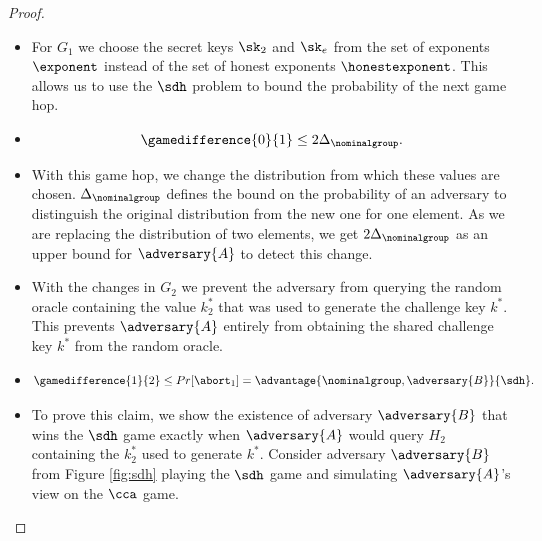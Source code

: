\begin{proof}
                                \begin{itemize}
                                \item[\textbf{Game 1}]
                                    For $G_1$ we choose the secret keys $\sk_2$ and $\sk_e$ from the set of exponents $\exponent$ instead of the set of honest exponents $\honestexponent$.
                                    This allows us to use the $\sdh$ problem to bound the probability of the next game hop.

                                \item[\emph{Claim 1}]

                                    \[ \gamedifference{0}{1} \leq 2 \Delta_{\nominalgroup}. \]

                                \item[\emph{Proof}]
                                    With this game hop, we change the distribution from which these values are chosen.
                                    $\Delta_{\nominalgroup}$ defines the bound on the probability of an adversary to distinguish the original distribution from the new one for one element.
                                    As we are replacing the distribution of two elements, we get $2 \Delta_{\nominalgroup}$ as an upper bound for $\adversary{A}$ to detect this change.
                                \end{itemize}

                                \begin{itemize}
                                \item[\textbf{Game 2}]
                                    With the changes in $G_2$ we prevent the adversary from querying the random oracle containing the value $k^*_2$ that was used to generate the challenge key $k^*$.
                                    This prevents $\adversary{A}$ entirely from obtaining the shared challenge key $k^*$ from the random oracle.

                                \item[\emph{Claim 2}]

                                    \[ \gamedifference{1}{2} \leq Pr[\abort_1] = \advantage{\nominalgroup, \adversary{B}}{\sdh}. \]

                                \item[\emph{Proof}]
                                    To prove this claim, we show the existence of adversary $\adversary{B}$ that wins the $\sdh$ game exactly when $\adversary{A}$ would query $H_2$ containing the $k^*_2$ used to generate $k^*$.
                                    Consider adversary $\adversary{B}$ from Figure \ref{fig:sdh} playing the $\sdh$ game and simulating $\adversary{A}$'s view on the $\cca$ game.


\end{itemize}
\end{proof}

